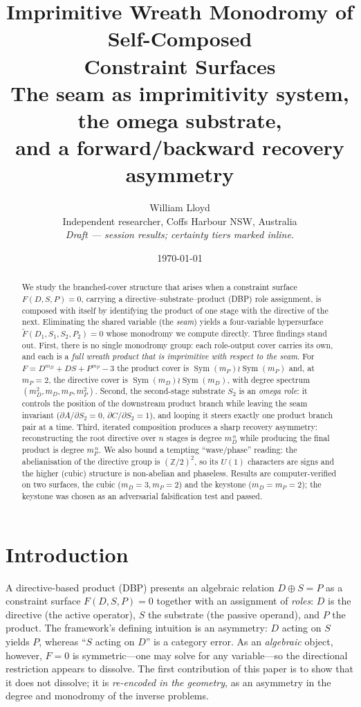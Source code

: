 \documentclass[11pt]{article}
\title{\textbf{Imprimitive Wreath Monodromy of Self-Composed\\ Constraint Surfaces}\\[4pt]
\large The seam as imprimitivity system, the omega substrate,\\ and a forward/backward recovery asymmetry}
\author{William Lloyd\\ \small Independent researcher, Coffs Harbour NSW, Australia\\[2pt]
\small \emph{Draft --- session results; certainty tiers marked inline.}}
\date{\today}
\theoremstyle{plain}
\theoremstyle{definition}
\theoremstyle{remark}
\newcommand{\Sym}{\operatorname{Sym}}
\newcommand{\Ftil}{\widetilde{F}}
\newcommand{\Z}{\mathbb{Z}}
\begin{document}
\maketitle

\begin{abstract}
We study the branched-cover structure that arises when a constraint surface
$F(D,S,P)=0$, carrying a directive--substrate--product (DBP) role assignment, is
composed with itself by identifying the product of one stage with the directive
of the next. Eliminating the shared variable (the \emph{seam}) yields a
four-variable hypersurface $\Ftil(D_1,S_1,S_2,P_2)=0$ whose monodromy we compute
directly. Three findings stand out. First, there is no single monodromy group:
each role-output cover carries its own, and each is a \emph{full wreath product
that is imprimitive with respect to the seam}. For $F = D^{m_D}+DS+P^{m_P}-3$ the
product cover is $\Sym(m_P)\wr\Sym(m_P)$ and, at $m_P=2$, the directive cover is
$\Sym(m_D)\wr\Sym(m_D)$, with degree spectrum $(m_D^2,m_D,m_P,m_P^2)$. Second, the
second-stage substrate $S_2$ is an \emph{omega role}: it controls the position of
the downstream product branch while leaving the seam invariant
($\partial A/\partial S_2=0$, $\partial C/\partial S_2=1$), and looping it steers
exactly one product branch pair at a time. Third, iterated composition produces a
sharp recovery asymmetry: reconstructing the root directive over $n$ stages is
degree $m_D^{\,n}$ while producing the final product is degree $m_P^{\,n}$. We
also bound a tempting ``wave/phase'' reading: the abelianisation of the directive
group is $(\Z/2)^2$, so its $U(1)$ characters are signs and the higher (cubic)
structure is non-abelian and phaseless. Results are computer-verified on two
surfaces, the cubic ($m_D=3,m_P=2$) and the keystone ($m_D=m_P=2$); the keystone
was chosen as an adversarial falsification test and passed.
\end{abstract}

\tableofcontents

\section{Introduction}

A directive-based product (DBP) presents an algebraic relation
$D\oplus S=P$ as a constraint surface $F(D,S,P)=0$ together with an assignment of
\emph{roles}: $D$ is the directive (the active operator), $S$ the substrate (the
passive operand), and $P$ the product. The framework's defining intuition is an
asymmetry: $D$ acting on $S$ yields $P$, whereas ``$S$ acting on $D$'' is a
category error. As an \emph{algebraic} object, however, $F=0$ is symmetric---one
may solve for any variable---so the directional restriction appears to dissolve.
The first contribution of this paper is to show that it does not dissolve; it is
\emph{re-encoded in the geometry}, as an asymmetry in the degree and monodromy of
the inverse problems.
\end{document}
